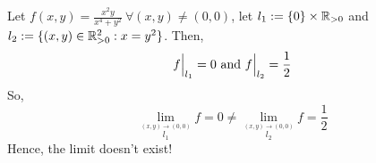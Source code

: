 Let $ f(x,y) = \frac{x^2y}{x^4+y^2} \ \forall (x,y) \not= (0,0) $, let $ l_1 := \{0\}\times\mathbb{R}_{>0} $ and $ l_2 := \{(x,y) \in \mathbb{R}_{>0}^2 : x=y^2 \} $.
Then, 
$$
f\Big|_{l_1} = 0 \ {\rm and} \ f\Big|_{l_2} = \frac{1}{2}
$$
So,
\[
  \lim_{\stackrel{(x,y) \to (0,0)}{l_1}} f = 0 \not= \lim_{\stackrel{(x,y) \to (0,0)}{l_2}} f = \frac{1}{2}
\]
Hence, the limit doesn't exist!